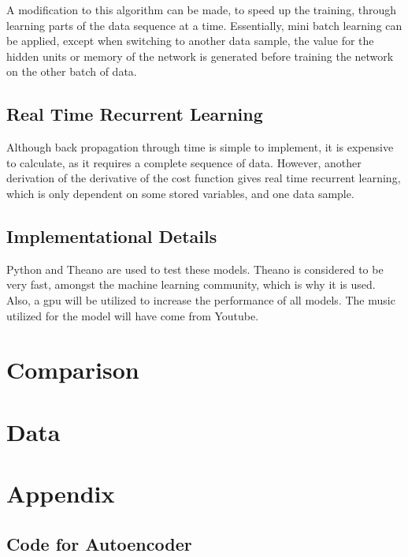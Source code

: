 \documentclass{article}
\begin{document}
A modification to this algorithm can be made, to speed up the training, through
learning parts of the data sequence at a time. Essentially, mini batch learning
can be applied, except when switching to another data sample, the value for the
hidden units or memory of the network is generated before training the network
on the other batch of data.

\subsection{Real Time Recurrent Learning}
Although back propagation through time is simple to implement, it is
expensive to calculate, as it requires a complete sequence of data. However,
another derivation of the derivative of the cost function gives real time
recurrent learning, which is only dependent on some stored variables, and one
data sample.

\subsection{Implementational Details}
Python and Theano are used to test these models. Theano is considered to be very
fast, amongst the machine learning community, which is why it is used. Also, a
gpu will be utilized to increase the performance of all models. The music
utilized for the model will have come from Youtube.

\section{Comparison}

\section{Data}

\section{Appendix}
\subsection{Code for Autoencoder}
%
\end{document}
